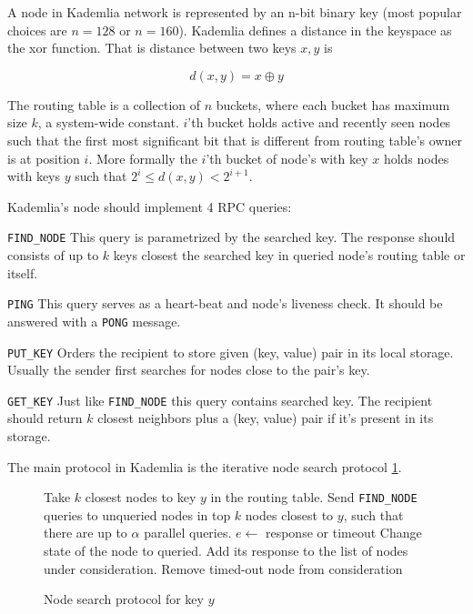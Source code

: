   A node in Kademlia network is represented by an n-bit binary key (most popular
  choices are $n = 128$ or $n = 160$). Kademlia defines a distance in the
  keyspace as the xor function. That is distance between two keys $x, y$ is

  \[ d(x, y) = x \oplus y\]

  The routing table is a collection of $n$ buckets, where each bucket has
  maximum size $k$, a system-wide constant. 
  $i$'th bucket holds active and recently seen nodes such that the first most
  significant bit that is different from routing table's owner is at position
  $i$. More formally the $i$'th bucket of node's with key $x$ holds nodes with
  keys $y$ such that $2^i \leq d(x, y) < 2^{i+1}$.

  Kademlia's node should implement 4 RPC queries:

  \begin{description}
    \item{\verb|FIND_NODE|} This query is parametrized by the searched key. The
      response should consists of up to $k$ keys closest the searched key in
      queried node's routing table or itself.
    \item{\verb|PING|} This query serves as a heart-beat and node's liveness
      check. It should be answered with a \verb|PONG| message.
    \item{\verb|PUT_KEY|} Orders the recipient to store given (key, value) pair
      in its local storage. Usually the sender first searches for nodes close
      to the pair's key.
    \item{\verb|GET_KEY|} Just like \verb|FIND_NODE| this query contains
      searched key. The recipient should return $k$ closest neighbors plus a
      (key, value) pair if it's present in its storage.
  \end{description}

  The main protocol in Kademlia is the iterative node search protocol
  \ref{fig:node_search_alg}.

  \begin{figure}
    \label{fig:node_search_alg}
    \begin{algorithmic}[1]
    \STATE Take $k$ closest nodes to key $y$ in the routing table.
    \STATE Send \verb|FIND_NODE| queries to unqueried nodes in top $k$ 
    nodes closest to $y$, such that there are up to $\alpha$ parallel queries.
    \STATE $e \leftarrow$ response or timeout
      \STATE Change state of the node to queried. Add its response to the list
      of
      nodes under consideration.
    \ELSE
      \STATE Remove timed-out node from consideration
    \ENDIF
    \ENDWHILE
  \end{algorithmic}
    \caption{Node search protocol for key $y$}
  \end{figure}

